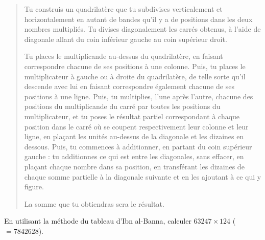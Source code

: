 \begin{quote}\footnotesize
Tu construis un quadrilat\`ere que tu subdivises verticalement et
horizontalement en autant de bandes qu'il y a de positions dans les
deux nombres multipli\'es. Tu divises diagonalement les carr\'es
obtenus, \`a l'aide de diagonale allant du coin inf\'erieur gauche au
coin sup\'erieur droit.

Tu places le multiplicande au-dessus du quadrilat\`ere, en faisant 
correspondre chacune de ses positions \`a une colonne. 
Puis, tu places le multiplicateur \`a gauche ou \`a droite du quadrilat\`ere,
de telle sorte qu'il descende avec lui en faisant correspondre \'egalement 
chacune de ses positions \`a une ligne. Puis, tu multiplies, 
l'une apr\`es l'autre, chacune des positions du multiplicande du carr\'e 
par toutes les positions du multiplicateur, et tu poses le r\'esultat 
partiel correspondant \`a chaque position dans le carr\'e o\`u se coupent 
respectivement leur colonne et leur ligne, en pla\c{c}ant les unit\'es 
au-dessus de la diagonale et les dizaines en dessous. Puis, tu
commences \`a additionner, en partant du coin sup\'erieur gauche :
tu additionnes ce qui est entre les diagonales, sans effacer, 
en pla\c{c}ant chaque nombre dans sa position, en transf\'erant 
les dizaines de chaque somme partielle \`a la diagonale suivante et
en les ajoutant \`a ce qui y figure. 

La somme que tu obtiendras sera le r\'esultat.
\end{quote}

En utilisant la m\'ethode du tableau d'Ibn al-Banna, calculer $63247\times124$ 
($= 7842628$).

